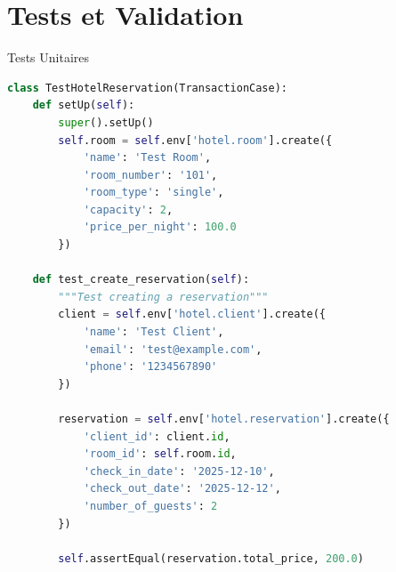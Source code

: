 \documentclass[aspectratio=169]{beamer}
\begin{document}
\section{Tests et Validation}

\begin{frame}[fragile]{Tests Unitaires}
    \begin{lstlisting}[language=Python]
class TestHotelReservation(TransactionCase):
    def setUp(self):
        super().setUp()
        self.room = self.env['hotel.room'].create({
            'name': 'Test Room',
            'room_number': '101',
            'room_type': 'single',
            'capacity': 2,
            'price_per_night': 100.0
        })
        
    def test_create_reservation(self):
        """Test creating a reservation"""
        client = self.env['hotel.client'].create({
            'name': 'Test Client',
            'email': 'test@example.com',
            'phone': '1234567890'
        })
        
        reservation = self.env['hotel.reservation'].create({
            'client_id': client.id,
            'room_id': self.room.id,
            'check_in_date': '2025-12-10',
            'check_out_date': '2025-12-12',
            'number_of_guests': 2
        })
        
        self.assertEqual(reservation.total_price, 200.0)
    \end{lstlisting}
\end{frame}
\end{document}
